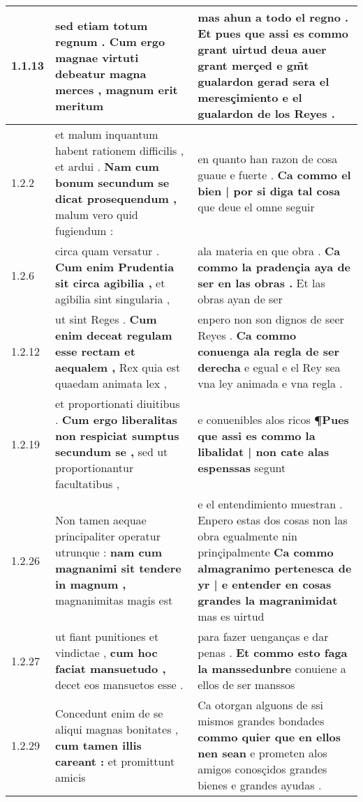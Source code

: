 \begin{tabular}{|p{1cm}|p{6.5cm}|p{6.5cm}|}

\hline
1.1.13 & sed etiam totum regnum . \textbf{ Cum ergo magnae virtuti debeatur magna merces , } magnum erit meritum & mas ahun a todo el regno . \textbf{ Et pues que assi es commo grant uirtud deua auer grant merçed } e gm̃t gualardon gerad sera el meresçimiento e el gualardon de los Reyes . \\\hline
1.2.2 & et malum inquantum habent rationem difficilis , et ardui . \textbf{ Nam cum bonum secundum se dicat prosequendum , } malum vero quid fugiendum : & en quanto han razon de cosa guaue e fuerte . \textbf{ Ca commo el bien | por si diga tal cosa } que deue el omne seguir \\\hline
1.2.6 & circa quam versatur . \textbf{ Cum enim Prudentia sit circa agibilia , } et agibilia sint singularia , & ala materia en que obra . \textbf{ Ca commo la pradençia aya de ser en las obras . } Et las obras ayan de ser \\\hline
1.2.12 & ut sint Reges . \textbf{ Cum enim deceat regulam esse rectam et aequalem , } Rex quia est quaedam animata lex , & enpero non son dignos de seer Reyes . \textbf{ Ca commo conuenga ala regla de ser derecha } e egual e el Rey sea vna ley animada e vna regla . \\\hline
1.2.19 & et proportionati diuitibus . \textbf{ Cum ergo liberalitas non respiciat sumptus secundum se , } sed ut proportionantur facultatibus , & e conuenibles alos ricos \textbf{ ¶Pues que assi es commo la libalidat | non cate alas espenssas } segunt \\\hline
1.2.26 & Non tamen aequae principaliter operatur utrunque : \textbf{ nam cum magnanimi sit tendere in magnum , } magnanimitas magis est & e el entendimiento muestran . Enpero estas dos cosas non las obra egualmente nin prinçipalmente \textbf{ Ca commo almagranimo pertenesca de yr | e entender en cosas grandes la magranimidat } mas es uirtud \\\hline
1.2.27 & ut fiant punitiones et vindictae , \textbf{ cum hoc faciat mansuetudo , } decet eos mansuetos esse . & para fazer uenganças e dar penas . \textbf{ Et commo esto faga la manssedunbre } conuiene a ellos de ser manssos \\\hline
1.2.29 & Concedunt enim de se aliqui magnas bonitates , \textbf{ cum tamen illis careant : } et promittunt amicis & Ca otorgan alguons de ssi mismos grandes bondades \textbf{ commo quier que en ellos nen sean } e prometen alos amigos conosçidos grandes bienes e grandes ayudas . \\\hline

\end{tabular}
